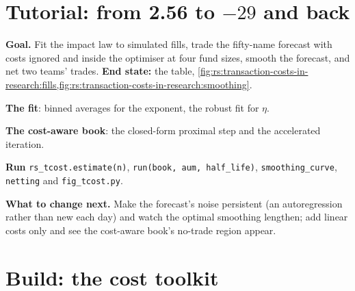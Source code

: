 \section{Tutorial: from 2.56 to $-29$ and back}\label{tut:rs:transaction-costs-in-research:tut}

\begin{tutorial}
\textbf{Goal.} Fit the impact law to simulated fills, trade the fifty-name forecast with costs ignored and inside the optimiser at four fund sizes, smooth the
forecast, and net two teams' trades. \textbf{End state:} the table, \cref{fig:rs:transaction-costs-in-research:fills,fig:rs:transaction-costs-in-research:smoothing}.
\begin{tutsteps}
\item \textbf{The fit}: binned averages for the exponent, the robust fit for $\eta$.
\label{lst:rs:transaction-costs-in-research:fit}
\item \textbf{The cost-aware book}: the closed-form proximal step and the accelerated iteration.
\label{lst:rs:transaction-costs-in-research:aware}
\item \textbf{Run} \texttt{rs\_tcost.estimate(n)}, \texttt{run(book, aum, half\_life)}, \texttt{smoothing\_curve}, \texttt{netting} and \texttt{fig\_tcost.py}.
\end{tutsteps}
\textbf{What to change next.} Make the forecast's noise persistent (an autoregression rather than new each day) and watch the optimal smoothing lengthen; add
linear costs only and see the cost-aware book's no-trade region appear.
\end{tutorial}

\section{Build: the cost toolkit}\label{bld:rs:transaction-costs-in-research:tcost}

